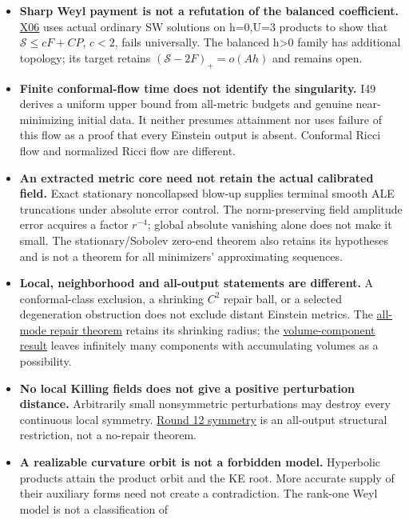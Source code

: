 \documentclass[
  10pt,
]{article}
\providecommand{\tightlist}{%
  \setlength{\itemsep}{0pt}\setlength{\parskip}{0pt}}
\begin{document}
\begin{itemize}
\tightlist
\item
  \textbf{Sharp Weyl payment is not a refutation of the balanced
  coefficient.}
  \href{../continuation/20260927_signed_balance_and_conformal_flow.md}{X06}
  uses actual ordinary SW solutions on h=0,U=3 products to show that
  \(\mathscr S\le cF+CP\), \(c<2\), fails universally. The balanced
  h\textgreater0 family has additional topology; its target retains
  \((\mathscr S-2F)_+=o(Ah)\) and remains open.
\item
  \textbf{Finite conformal-flow time does not identify the singularity.}
  I49 derives a uniform upper bound from all-metric budgets and genuine
  near-minimizing initial data. It neither presumes attainment nor uses
  failure of this flow as a proof that every Einstein output is absent.
  Conformal Ricci flow and normalized Ricci flow are different.
\item
  \textbf{An extracted metric core need not retain the actual calibrated
  field.} Exact stationary noncollapsed blow-up supplies terminal smooth
  ALE truncations under absolute error control. The norm-preserving
  field amplitude error acquires a factor \(r^{-4}\); global absolute
  vanishing alone does not make it small. The stationary/Sobolev
  zero-end theorem also retains its hypotheses and is not a theorem for
  all minimizers' approximating sequences.
\item
  \textbf{Local, neighborhood and all-output statements are different.}
  A conformal-class exclusion, a shrinking \(C^2\) repair ball, or a
  selected degeneration obstruction does not exclude distant Einstein
  metrics. The
  \href{../mathematics/current/round14_repair_radius.md}{all-mode repair
  theorem} retains its shrinking radius; the
  \href{../mathematics/current/round13_global.md}{volume-component
  result} leaves infinitely many components with accumulating volumes as
  a possibility.
\item
  \textbf{No local Killing fields does not give a positive perturbation
  distance.} Arbitrarily small nonsymmetric perturbations may destroy
  every continuous local symmetry.
  \href{../mathematics/current/round12_symmetry.md}{Round 12 symmetry}
  is an all-output structural restriction, not a no-repair theorem.
\item
  \textbf{A realizable curvature orbit is not a forbidden model.}
  Hyperbolic products attain the product orbit and the KE root. More
  accurate supply of their auxiliary forms need not create a
  contradiction. The rank-one Weyl model is not a classification of

\end{itemize}
\end{document}
